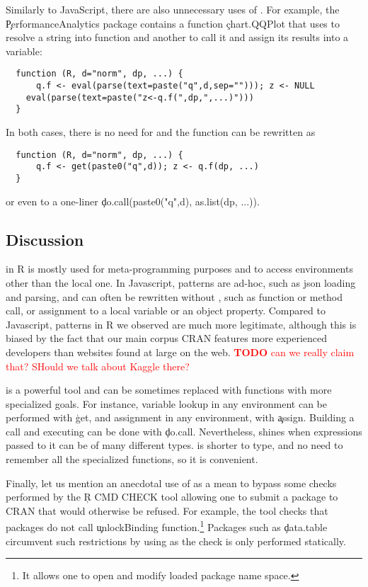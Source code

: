 \documentclass[review,screen,acmsmall,anonymous=true]{acmart}
\newcommand{\authorcomment}[3]{\xspace\textcolor{#1}{{\bf #2} #3}\xspace}
\newcommand{\todo}[1]{\authorcomment{red}{TODO}{#1}}
\begin{document}
Similarly to JavaScript, there are also unnecessary uses of \eval. For example,
the \c{PerformanceAnalytics} package contains a function \c{chart.QQPlot} that
uses \eval to resolve a string into function and another to call it and assign
its results into a variable:
\begin{lstlisting}
  function (R, d="norm", dp, ...) {
	  q.f <- eval(parse(text=paste("q",d,sep=""))); z <- NULL
  	eval(parse(text=paste("z<-q.f(",dp,",...)")))
  }
\end{lstlisting}
  In both cases, there is no need for \eval and the function can be rewritten as
\begin{lstlisting}
  function (R, d="norm", dp, ...) {
	  q.f <- get(paste0("q",d)); z <- q.f(dp, ...)
  }
\end{lstlisting}
or even to a one-liner \c{do.call(paste0("q",d), as.list(dp, ...))}.


\subsection{Discussion}

\Eval in R is mostly used for meta-programming purposes and to access
environments other than the local one. In Javascript, patterns are ad-hoc, such
as json loading and parsing, and can often be rewritten without \eval, such as
function or method call, or assignment to a local variable or an object
property. Compared to Javascript, \eval patterns in R we observed are much more
legitimate, although this is biased by the fact that our main corpus CRAN
features more experienced developers than  websites found at large on the web.
\todo{can we really claim that? SHould we talk about Kaggle there?}

\eval is a powerful tool and can be sometimes replaced with functions with more
specialized goals. For instance, variable lookup in any environment can be
performed with \c{get}, and assignment in any environment, with \c{assign}.
Building a call and executing can be done with \c{do.call}. Nevertheless, \eval
shines when expressions passed to it can be of many different types. %
is shorter to type, and no need to remember all the specialized functions, so
it is convenient.

Finally, let us mention an anecdotal use of \eval as a mean to bypass some
checks performed by the \c{R CMD CHECK} tool allowing one to submit a package
to CRAN that would otherwise be refused. For example, the tool checks that
packages do not call \c{unlockBinding} function.\footnote{It allows one to open
and modify loaded package name space.} Packages such as \c{data.table}
circumvent such restrictions by using \eval as the check is only performed
statically.
\end{document}
